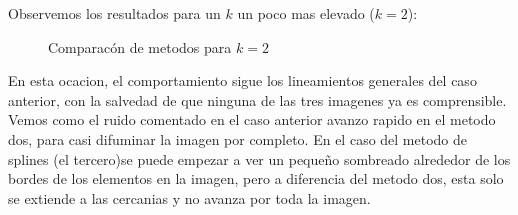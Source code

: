 Observemos los resultados para un $k$ un poco mas elevado ($k=2$):

\begin{figure}[H]
    \centering
    \qquad
    \qquad
    \caption{Comparacón de metodos para $k = 2$}
    \label{fig:example}
\end{figure}

En esta ocacion, el comportamiento sigue los lineamientos generales del caso anterior, con la salvedad de que ninguna de las tres imagenes ya es comprensible. Vemos como el ruido comentado en el caso anterior avanzo rapido en el metodo dos, para casi difuminar la imagen por completo. En el caso del metodo de splines (el tercero)se puede empezar a ver un pequeño sombreado alrededor de los bordes de los elementos en la imagen, pero a diferencia del metodo dos, esta solo se extiende a las cercanias y no avanza por toda la imagen.

